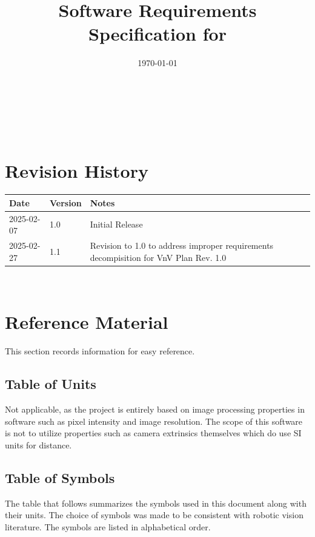 \documentclass[12pt]{article}
\begin{document}
\title{Software Requirements Specification for \progname} 
\author{\authname}
\date{\today}
	
\maketitle

~\newpage


\tableofcontents

~\newpage

\section*{Revision History}

\begin{tabularx}{\textwidth}{p{3cm}p{2cm}X}
\toprule {\bf Date} & {\bf Version} & {\bf Notes}\\
\midrule
2025-02-07 & 1.0 & Initial Release\\
2025-02-27 & 1.1 & Revision to 1.0 to address improper requirements decompisition for VnV Plan Rev. 1.0\\
\bottomrule
\end{tabularx}
~\newpage

\section{Reference Material}

This section records information for easy reference.

\subsection{Table of Units}
Not applicable, as the project is entirely based on image processing 
properties in software such as pixel intensity and image resolution. 
The scope of this software is not to utilize properties such as camera 
extrinsics themselves which do use SI units for distance.

\subsection{Table of Symbols}

The table that follows summarizes the symbols used in this document along with
their units.  The choice of symbols was made to be consistent with robotic vision literature. 
The symbols are listed in alphabetical order.
\end{document}

